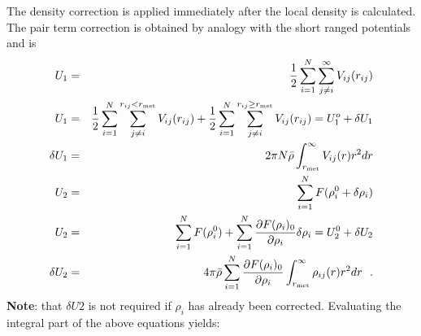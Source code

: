 The density correction is applied immediately after the local
density is calculated.  The pair term correction is obtained by
analogy with the short ranged potentials and is
\begin{eqnarray}
U_{1} &=& {1 \over 2} \sum_{i=1}^{N} \sum_{j \ne i}^{\infty} V_{ij}(r_{ij}) \nonumber \\
U_{1} &=& {1 \over 2} \sum_{i=1}^{N} \sum_{j \ne i}^{r_{ij}<r_{\rm met}} V_{ij}(r_{ij}) +
{1 \over 2} \sum_{i=1}^{N} \sum_{j \ne i}^{r_{ij} \ge r_{\rm met}} V_{ij}(r_{ij}) =
U_{1}^{o} + \delta U_{1} \nonumber \\
\delta U_{1} &=& 2 \pi N \bar{\rho} \int_{r_{\rm met}}^{\infty} V_{ij}(r) r^{2} dr \nonumber \\
U_{2} &=& \sum_{i=1}^{N} F(\rho_{i}^{0} + \delta \rho_{i}) \\
U_{2} &=& \sum_{i=1}^{N} F(\rho_{i}^{0}) +
\sum_{i=1}^{N} \frac{\partial F(\rho_{i})_{0}}{\partial \rho_{i}} \delta \rho_{i} =
U_{2}^{0} + \delta U_{2} \nonumber \\
\delta U_{2} &=& 4 \pi \bar{\rho} \sum_{i=1}^{N} \frac{\partial F(\rho_{i})_{0}}{\partial \rho_{i}}
\int_{r_{\rm met}}^{\infty} \rho_{ij}(r) r^{2} dr~~. \nonumber
\end{eqnarray}
{\bf Note}: that $\delta U{2}$ is not required if
$\rho_{i}$ has already been corrected.  Evaluating the
integral part of the above equations yields:
